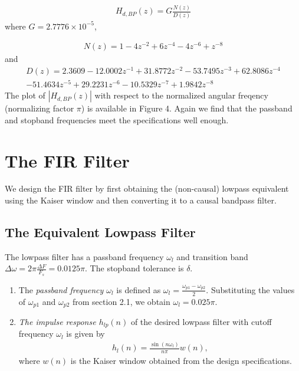 \documentclass{article}
\begin{document}
\begin{eqnarray}
H_{d,BP}(z) = G \frac{N(z)}{D(z)}
\end{eqnarray}
where $G = 2.7776 \times 10^{-5}$,

\begin{eqnarray}
N(z)=  1 - 4 z^{-2} + 6 z^{-4} - 4z^{-6} + z^{-8} 
\end{eqnarray}
and
\begin{eqnarray}
D(z) = 2.3609  -12.0002z^{-1} + 31.8772z^{-2}  -53.7495z^{-3}+  62.8086z^{-4}\nonumber \\
  -51.4634z^{-5}+   29.2231z^{-6}  -10.5329z^{-7} +   1.9842z^{-8}
\end{eqnarray}
The plot of $|H_{d,BP}(z)|$ with respect to the normalized angular freqency (normalizing factor $\pi$) is available in Figure 4.  Again we
find that the passband and stopband frequencies meet the specifications well enough.



\section{The FIR Filter}
We design the FIR filter by first obtaining the (non-causal) lowpass equivalent using the Kaiser window
and then
converting it to a causal bandpass filter.

\subsection{The Equivalent Lowpass Filter}
The lowpass filter has a passband frequency $\omega_l$ and transition band $\Delta \omega = 2\pi \frac{\Delta F}{F_s} = 0.0125\pi$.
The stopband tolerance is $\delta$.
\begin{enumerate}
\item  The {\em passband frequency $\omega_l$}  is defined as $\omega_l = \frac{\omega_{p1} - \omega_{p2}}{2}$.  Substituting the values of $\omega_{p1}$ and $\omega_{p2}$ from section 2.1, we obtain $\omega_l = 0.025\pi$.

\item {\em The impulse response $h_{lp}(n)$} of the desired lowpass filter with cutoff frequency $\omega_l$
is given by
\begin{eqnarray}
\label{firlpdef}
h_l(n) = \frac{\sin(n\omega_l)}{n\pi}w(n),
\end{eqnarray}
where $w(n)$ is the Kaiser window obtained from the design specifications.
\end{enumerate}
\end{document}
